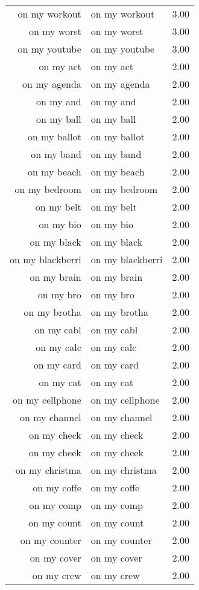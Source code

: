 \begin{table}[ht]
\begin{tabular}{rlr}
  on my workout & on my workout & 3.00 \\ 
  on my worst & on my worst & 3.00 \\ 
  on my youtube & on my youtube & 3.00 \\ 
  on my act & on my act & 2.00 \\ 
  on my agenda & on my agenda & 2.00 \\ 
  on my and & on my and & 2.00 \\ 
  on my ball & on my ball & 2.00 \\ 
  on my ballot & on my ballot & 2.00 \\ 
  on my band & on my band & 2.00 \\ 
  on my beach & on my beach & 2.00 \\ 
  on my bedroom & on my bedroom & 2.00 \\ 
  on my belt & on my belt & 2.00 \\ 
  on my bio & on my bio & 2.00 \\ 
  on my black & on my black & 2.00 \\ 
  on my blackberri & on my blackberri & 2.00 \\ 
  on my brain & on my brain & 2.00 \\ 
  on my bro & on my bro & 2.00 \\ 
  on my brotha & on my brotha & 2.00 \\ 
  on my cabl & on my cabl & 2.00 \\ 
  on my calc & on my calc & 2.00 \\ 
  on my card & on my card & 2.00 \\ 
  on my cat & on my cat & 2.00 \\ 
  on my cellphone & on my cellphone & 2.00 \\ 
  on my channel & on my channel & 2.00 \\ 
  on my check & on my check & 2.00 \\ 
  on my cheek & on my cheek & 2.00 \\ 
  on my christma & on my christma & 2.00 \\ 
  on my coffe & on my coffe & 2.00 \\ 
  on my comp & on my comp & 2.00 \\ 
  on my count & on my count & 2.00 \\ 
  on my counter & on my counter & 2.00 \\ 
  on my cover & on my cover & 2.00 \\ 
  on my crew & on my crew & 2.00 \\ 

\end{tabular}
\end{table}

